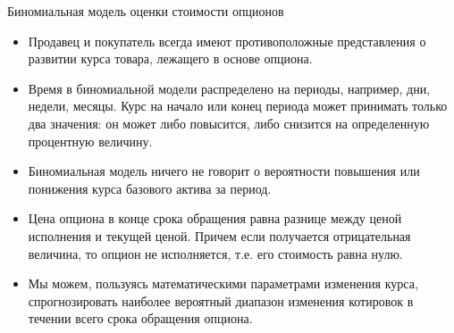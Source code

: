 \documentclass[_fin_decisions_lectures.tex]{subfiles}
\begin{document}
\begin{frame}{Биномиальная модель оценки стоимости опционов}
\begin{itemize}
	\item
	Продавец и покупатель всегда имеют противоположные представления о развитии курса товара, лежащего в основе опциона. 
	\item
	Время в биномиальной модели распределено на периоды, например, дни, недели, месяцы. Курс на начало или конец периода может принимать только два значения: он может либо повысится, либо снизится на определенную процентную величину. 
	\item
	Биномиальная модель ничего не говорит о вероятности повышения или понижения курса базового актива за период.
\end{itemize}
\end{frame}

\begin{frame}{}
\begin{itemize}
\item
Цена опциона в конце срока обращения равна разнице между ценой исполнения и текущей ценой. Причем если получается отрицательная величина, то опцион не исполняется, т.е. его стоимость равна нулю. 
\item
Мы можем, пользуясь математическими параметрами изменения курса, спрогнозировать наиболее вероятный диапазон изменения котировок в течении всего срока обращения опциона. 
\end{itemize}
\end{frame}
\end{document}
